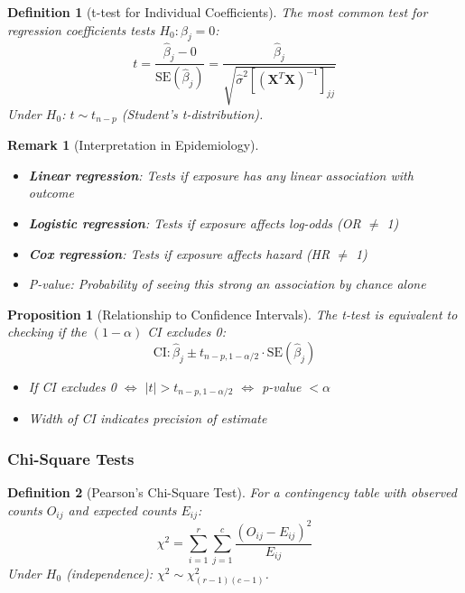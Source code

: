 \documentclass{article}
\newtheorem{definition}{Definition}
\newtheorem{proposition}{Proposition}
\newtheorem{remark}{Remark}
\begin{document}
\begin{definition}[t-test for Individual Coefficients]
The most common test for regression coefficients tests $H_0: \beta_j = 0$:
\begin{equation}
t = \frac{\hat{\beta}_j - 0}{\text{SE}(\hat{\beta}_j)} = \frac{\hat{\beta}_j}{\sqrt{\hat{\sigma}^2[(\mathbf{X}^T\mathbf{X})^{-1}]_{jj}}}
\end{equation}
Under $H_0$: $t \sim t_{n-p}$ (Student's t-distribution).
\end{definition}

\begin{remark}[Interpretation in Epidemiology]
\begin{itemize}
    \item \textbf{Linear regression}: Tests if exposure has any linear association with outcome
    \item \textbf{Logistic regression}: Tests if exposure affects log-odds (OR $\neq$ 1)
    \item \textbf{Cox regression}: Tests if exposure affects hazard (HR $\neq$ 1)
    \item P-value: Probability of seeing this strong an association by chance alone
\end{itemize}
\end{remark}

\begin{proposition}[Relationship to Confidence Intervals]
The t-test is equivalent to checking if the $(1-\alpha)$ CI excludes 0:
\begin{equation}
\text{CI}: \hat{\beta}_j \pm t_{n-p,1-\alpha/2} \cdot \text{SE}(\hat{\beta}_j)
\end{equation}
\begin{itemize}
    \item If CI excludes 0 $\Leftrightarrow$ $|t| > t_{n-p,1-\alpha/2}$ $\Leftrightarrow$ p-value $< \alpha$
    \item Width of CI indicates precision of estimate
\end{itemize}
\end{proposition}

\subsubsection{Chi-Square Tests}

\begin{definition}[Pearson's Chi-Square Test]
For a contingency table with observed counts $O_{ij}$ and expected counts $E_{ij}$:
\begin{equation}
\chi^2 = \sum_{i=1}^r \sum_{j=1}^c \frac{(O_{ij} - E_{ij})^2}{E_{ij}}
\end{equation}
Under $H_0$ (independence): $\chi^2 \sim \chi^2_{(r-1)(c-1)}$.
\end{definition}
\end{document}
